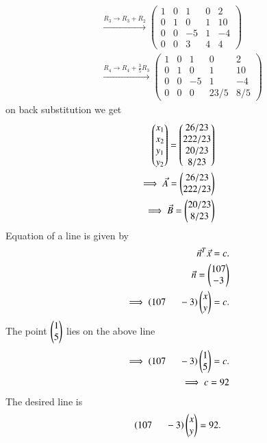 \documentclass[journal]{IEEEtran}
\begin{document}
\begin{align}
&\xrightarrow{R_3 \rightarrow R_3+R_2} \left(\begin{array}{cccc|c}
        1 & 0 & 1 & 0 & 2\\
        0 & 1 & 0 & 1 & 10\\
        0 & 0 & -5 & 1 & -4\\
        0 & 0 & 3 & 4 & 4
\end{array}\right)\\
&\xrightarrow{R_4 \rightarrow R_4+\frac{3}{5}R_3} \left(\begin{array}{cccc|c}
        1 & 0 & 1 & 0 & 2\\
        0 & 1 & 0 & 1 & 10\\
        0 & 0 & -5 & 1 & -4\\
        0 & 0 & 0 & 23/5 & 8/5
\end{array}\right)
\end{align}
on back substitution we get
\begin{align}
\begin{pmatrix}x_1\\x_2\\y_1\\y_2\end{pmatrix}=\begin{pmatrix}26/23\\222/23\\20/23\\8/23\end{pmatrix}\\
  \implies \Vec{A}=\begin{pmatrix}26/23\\ 222/23\end{pmatrix}\\
\implies   \Vec{B}=\begin{pmatrix}20/23 \\ 8/23\end{pmatrix}
\end{align}
Equation of a line is given by
\begin{align}
    \Vec{n}^T\Vec{x}=c.\\
    \Vec{n}=\begin{pmatrix}107\\-3\end{pmatrix}\\
    \implies \left(107\hspace{0.5cm}-3\right)\begin{pmatrix}x\\y\end{pmatrix}=c.
\end{align}
The point $\begin{pmatrix}1\\5\end{pmatrix}$ lies on the above line
\begin{align}
 \implies \left(107\hspace{0.5cm}-3\right)\begin{pmatrix}1\\5\end{pmatrix}=c.\\
 \implies c=92
\end{align}
The desired line is 
\begin{align}
    \left(107\hspace{0.5cm}-3\right)\begin{pmatrix}x\\y\end{pmatrix}=92.
\end{align}
\end{document}
